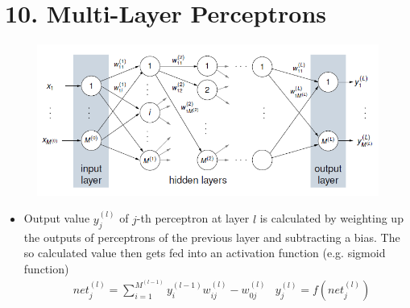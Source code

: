 \section*{10. Multi-Layer Perceptrons}
\begin{figure}[H]
    \centering
    \includegraphics[scale=0.6]{figures/nn}
\end{figure}
\begin{itemize}
    \item
        Output value $y_j^{(l)}$ of $j$-th perceptron at layer $l$ is calculated by weighting up the outputs of perceptrons of the previous layer and subtracting a bias. The so calculated value then gets fed into an activation function (e.g. sigmoid function)
        \begin{align*}
            &net_j^{(l)} = \sum_{i=1}^{M^{(l-1)}} y_i^{(l-1)}w_{ij}^{(l)} - w_{0j}^{(l)}
            &y_j^{(l)} = f(net_j^{(l)})
        \end{align*}
\end{itemize}
